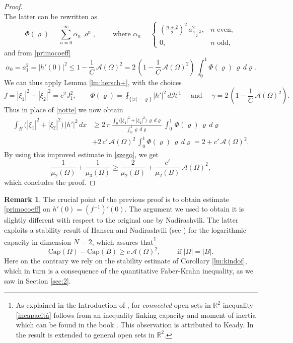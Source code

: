\documentclass{amsart}
\theoremstyle{definition}
\newtheorem{remark}[lemma]{Remark}
\numberwithin{equation}{section}
\begin{document}
\begin{proof}
\[\]
The latter can be rewritten as
\[
\Phi(\varrho)=\sum_{n=0}^\infty \alpha_n\,\varrho^n,\qquad \mbox{ where } \alpha_n=\begin{cases}\left(\frac{n+2}{2}\right)^2\,a^2_{\frac{n+2}{2}}, & n \mbox{ even},\\
0, & n \mbox{ odd},
\end{cases}
\]
and from \eqref{primocoeff}
\[
\alpha_0=a_1^2=|h'(0)|^2\le 1-\frac{1}{C}\,\mathcal{A}(\Omega)^2=2\,\left(1-\frac{1}{C}\,\mathcal{A}(\Omega)^2\right)\,\int_0^1 \Phi(\varrho)\,\varrho\,d\varrho.
\]
We can thus apply Lemma \ref{lm:hersch+}, with the choices
\[
f=|\xi_1|^2+|\xi_2|^2=c^2 J_1^2,\qquad \Phi(\varrho)=\fint_{\{|x|=\varrho\}} |h'|^2\,d\mathcal{H}^1\quad \mbox{ and }\quad \gamma=2\,\left(1-\frac{1}{C}\,\mathcal{A}(\Omega)^2\right).
\]
Thus in place of \eqref{notte} we now obtain
\[
\begin{split}
\int_B \Big(|\xi_1|^2+|\xi_2|^2\Big)\,|h'|^2\,dx&\ge 2\,\pi\,\frac{\displaystyle\int_0^1 \Big(|\xi_1|^2+|\xi_2|^2\Big)\,\varrho\,d\varrho}{\displaystyle\int_0^1 \varrho\,d\varrho}\,\int_0^1\, \Phi(\varrho)\,\varrho\,d\varrho\\
&+2\,c'\,\mathcal{A}(\Omega)^2\,\int_0^1 \Phi(\varrho)\,\varrho\,d\varrho=2+c'\,\mathcal{A}(\Omega)^2.
\end{split}
\]
By using this improved estimate in \eqref{szego}, we get
\[
\frac{1}{\mu_2(\Omega)}+\frac{1}{\mu_3(\Omega)}\ge \frac{2}{\mu_2(B)}+\frac{c'}{\mu_2(B)}\,\mathcal{A}(\Omega)^2,
\]
which concludes the proof.
\end{proof}
\begin{remark}
\label{oss:capacity}
The crucial point of the previous proof is to obtain estimate \eqref{primocoeff} on $h'(0)=(f^{-1})'(0)$. The argument we used to obtain it is slightly different with respect to the original one by Nadirashvili. The latter exploits a stability result of Hansen and Nadirashvili (see \cite[Corollary 2]{MR1222458}) for the logarithmic capacity in dimension $N=2$, which assures that\footnote{As explained in the Introduction of \cite{MR1243100}, for {\it connected} open sets in $\mathbb{R}^2$ inequality \eqref{incapacità} follows from an inequality linking capacity and moment of inertia which can be found in the book \cite{MR0043486}. This observation is attributed to Keady. In \cite{MR1222458} the result is extended to general open sets in $\mathbb{R}^2$.}
\begin{equation}
\label{incapacità}
\mathrm{Cap}(\Omega)-\mathrm{Cap}(B)\ge c\, \mathcal{A}(\Omega)^2,\qquad \mbox{ if }|\Omega|=|B|.
\end{equation}
Here on the contrary we rely on the stability estimate of Corollary \ref{lm:kindof}, which in turn is a consequence of the quantitative Faber-Krahn inequality, as we saw in Section \ref{sec:2}.
\end{remark}
\end{document}
